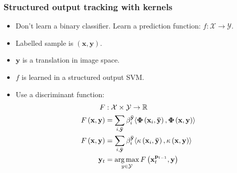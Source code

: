 \begin{frame}
    \frametitle{Structured output tracking with kernels \cite{6126251}}
    \begin{itemize}
        \item Don't learn a binary classifier. Learn a prediction function: \(f : \mathcal{X} \rightarrow \mathcal{Y}\).
        \item Labelled sample is \((\mathbf{x}, \mathbf{y})\).
        \item \(\mathbf{y}\) is a translation in image space.
        \item \(f\) is learned in a structured output SVM.
        \item Use a discriminant function:
            \begin{align}
                F &: \mathcal{X} \times \mathcal{Y} \rightarrow \mathbb{R} \\
                F\left(\mathbf{x}, \mathbf{y}\right) &= \sum_{i, \mathbf{\bar{y}}} \beta_i^\mathbf{\bar{y}}
                    \langle \mathbf{\Phi}\left(\mathbf{x}_i, \mathbf{\bar{y}}\right),
                    \mathbf{\Phi}\left(\mathbf{x}, \mathbf{y}\right) \rangle \\
                \label{eq:discriminant_function}
                F\left(\mathbf{x}, \mathbf{y}\right) &= \sum_{i, \mathbf{\bar{y}}} \beta_i^\mathbf{\bar{y}}
                    \langle \kappa\left(\mathbf{x}_i, \mathbf{\bar{y}}\right),
                    \kappa\left(\mathbf{x}, \mathbf{y}\right) \rangle \\
                \mathbf{y}_t &= \operatorname*{arg\,max}\limits_{y \in \mathcal{Y}} F \left( \mathbf{x}_t^{\mathbf{p}_{t-1}}, \mathbf{y} \right)
            \end{align}
    \end{itemize}
\end{frame}
